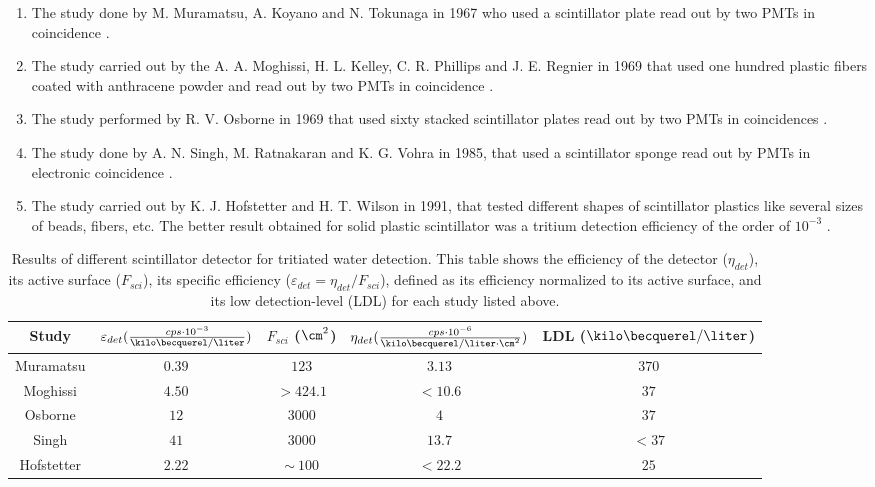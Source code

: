 \begin{enumerate}

\item{} The study done by M. Muramatsu, A. Koyano and N. Tokunaga in 1967 who used a scintillator plate read out by two PMTs in coincidence \cite{Muramatsu}.

\item{} The study carried out by the A. A. Moghissi, H. L. Kelley, C. R. Phillips and J. E. Regnier in 1969 that used one hundred plastic fibers coated with anthracene powder and read out by two PMTs in coincidence \cite{Moghissi}.

\item{} The study performed by R. V. Osborne in 1969 that used sixty stacked scintillator plates read out by two PMTs in coincidences \cite{Osborne}.

\item{} The study done by A. N. Singh, M. Ratnakaran and K. G. Vohra in 1985, that used a scintillator sponge read out by PMTs in electronic coincidence \cite{Ratnakaran, Ratnakaran2000}.

\item{} The study carried out by K. J. Hofstetter and H. T. Wilson in 1991, that tested different shapes of scintillator plastics like several sizes of beads, fibers, etc. The better result obtained for solid plastic scintillator was a tritium detection efficiency of the order of $10^{-3}$ \cite{Hofstetter1, Hofstetter2}.

\end{enumerate}
\begin{table}[htbp]
\begin{center}
\begin{tabular}{|c|c|c|c|c|}
\hline
Study & \parbox{5.5em}{\centering $\varepsilon_{det}(\frac{cps \cdot{} 10^{-3}}{\kilo\becquerel/\liter})$}  & \parbox{4.5em}{\centering $F_{sci}$ ($\cm^2$)}  & \parbox{6.5em}{\centering $\eta_{det}(\frac{cps \cdot{} 10^{-6}}{\kilo\becquerel/ \liter \cdot{} \cm^2})$} & LDL ($\kilo\becquerel / \liter$)\\
\hline \hline \hline
Muramatsu & $0.39$ & $123$ & $3.13$ & $370$ \\ \hline
Moghissi & $4.50$ & $>424.1$ & $<10.6$ & $37$ \\\hline
Osborne & $12$ & $3000$ & $4$ & $37$ \\ \hline
Singh & $41$ & $3000$ & $13.7$ & $<37$ \\ \hline
Hofstetter & $2.22$ & $\sim~100$ & $<22.2$ & $25$ \\ \hline
\end{tabular}
\caption{Results of different scintillator detector for tritiated water detection. This table shows the efficiency of the detector ($\eta_{det}$), its active surface ($F_{sci}$), its specific efficiency ($\varepsilon_{det}=\eta_{det}/F_{sci}$), defined as its efficiency normalized to its active surface, and its low detection-level (LDL) for each study listed above.}
\label{tab:PlasticScinTritium}
\end{center}
\end{table}

